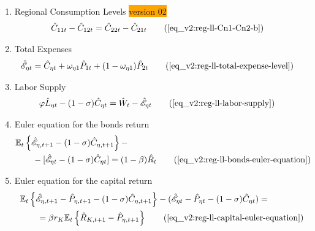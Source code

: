 \documentclass[../thesis.tex]{subfiles}
\begin{document}
{\begin{itemize}
\begin{enumerate}
\item Regional Consumption Levels \colorbox{orange}{version 02}
\begin{align}
	\hat{C}_{11t} - \hat{C}_{12t} &= \hat{C}_{22t} - \hat{C}_{21t} \tag{\ref{eq_v2:reg-ll-Cn1-Cn2-b}}
\end{align}		

		
		\begin{comment}
			
		\item Regional Levels of Consumption and Prices
		\begin{align}
			\hat{C}_{\eta 1 t} - \hat{C}_{\eta 2 t} &= \hat{P}_{2 t} - \hat{P}_{1 t} \tag{\ref{eq_v2:reg-ll-regional-consumption-and-prices}}
		\end{align}	
			
		\end{comment}
		
		
		\item Total Expenses
		\begin{align}
			\hat{\mathscr{E}}_{\eta t} &= \hat{C}_{\eta t} + \omega_{\eta 1} \hat{P}_{1 t} + (1 -\omega_{\eta 1}) \hat{P}_{2 t} \tag{\ref{eq_v2:reg-ll-total-expense-level}}
		\end{align}

		\item Labor Supply
		\begin{alignat}{2}
			\varphi \hat{L}_{\eta t} - (1 -\sigma) \hat{C}_{\eta t} &= \hat{W}_t - \hat{ \mathscr{E} }_{\eta t} \tag{\ref{eq_v2:reg-ll-labor-supply}}
		\end{alignat}
		
		\item Euler equation for the bonds return
		\begin{alignat}{2}
			& \E \left\{ \hat{\mathscr{E}}_{\eta, t+1} - (1 -\sigma)\hat{C}_{\eta, t+1} \right\} - \nonumber \\ & \qquad - [\hat{\mathscr{E}}_{\eta t} - (1 -\sigma)\hat{C}_{\eta t}] = (1 -\beta) \hat{R}_{t} \tag{\ref{eq_v2:reg-ll-bonds-euler-equation}}
		\end{alignat}
		
		\item Euler equation for the capital return
		\begin{alignat}{2}
			& \E \left\{ \hat{\mathscr{E}}_{\eta, t+1} - \hat{P}_{\eta, t+1}  - (1 -\sigma) \hat{C}_{\eta, t+1} \right\} - (\hat{\mathscr{E}}_{\eta t} - \hat{P}_{\eta t} - (1 -\sigma) \hat{C}_{\eta t}) = \nonumber \\
			& \qquad = \beta r_{K} \mathbb{E}_t \left\{ \hat{R}_{K, t+1} - \hat{P}_{\eta, t+1} \right\} \tag{\ref{eq_v2:reg-ll-capital-euler-equation}}
		\end{alignat}
		

\end{enumerate}
\end{itemize}}
\end{document}
